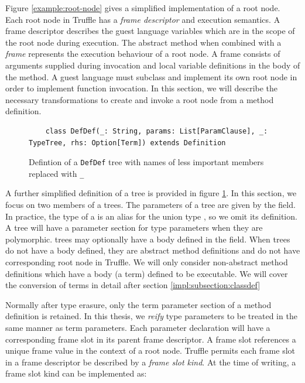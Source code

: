 Figure \ref{example:root-node} gives a simplified implementation of a root node.
Each root node in Truffle has a \textit{frame descriptor} and execution semantics.
A frame descriptor describes the guest language variables which are in the scope of the root node during execution.
The abstract  method when combined with a \textit{frame} represents the execution behaviour of a root node.
A frame consists of arguments supplied during invocation and local variable definitions in the body of the method.
A guest language must subclass and implement its own root node in order to implement function invocation.
In this section, we will describe the necessary transformations to create and invoke a root node from a  method definition.

\begin{figure}[!htb]
	\begin{verbatim}
	class DefDef(_: String, params: List[ParamClause], _: TypeTree, rhs: Option[Term]) extends Definition	
	\end{verbatim}
	\caption{Defintion of a \texttt{DefDef} tree with names of less important members replaced with \texttt{\_}}
	\label{recall:defdef}
\end{figure}

A further simplified definition of a  tree is provided in figure \ref{recall:defdef}.
In this section, we focus on two members of a  trees.
The parameters of a  tree are given by the  field.
In practice, the type of a  is an alias for the union type , so we omit its definition.
A  tree will have a parameter section for type parameters when they are polymorphic.
 trees may optionally have a body defined in the  field.
When trees do not have a body defined, they are abstract method definitions and do not have corresponding root node in Truffle.
We will only consider non-abstract method definitions which have a body (a term) defined to be executable.
We will cover the conversion of terms in detail after section \ref{impl:subsection:classdef}

Normally after type erasure, only the term parameter section of a method definition is retained.
In this thesis, we \textit{reify} type parameters to be treated in the same manner as term parameters.
Each parameter declaration will have a corresponding frame slot in its parent frame descriptor. 
A frame slot references a unique frame value in the context of a root node.
Truffle permits each frame slot in a frame descriptor be described by a \textit{frame slot kind}.
At the time of writing, a frame slot kind can be implemented as:

